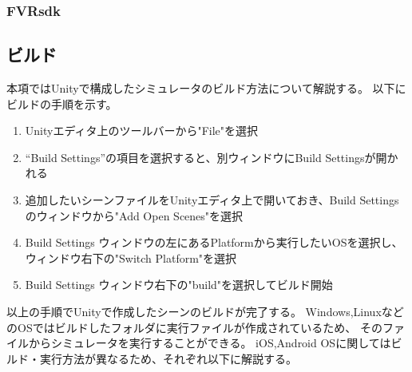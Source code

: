 \documentclass{ltjsreport}
\begin{document}
			\subsubsection{FVRsdk}
		\subsection{ビルド}
			本項ではUnityで構成したシミュレータのビルド方法について解説する。
			以下にビルドの手順を示す。
			\begin{enumerate}
				\item Unityエディタ上のツールバーから"File"を選択
				\item ``Build Settings''の項目を選択すると、別ウィンドウにBuild Settingsが開かれる
				\item 追加したいシーンファイルをUnityエディタ上で開いておき、Build Settingsのウィンドウから"Add Open Scenes"を選択
				\item Build Settings ウィンドウの左にあるPlatformから実行したいOSを選択し、ウィンドウ右下の"Switch Platform"を選択
				\item Build Settings ウィンドウ右下の"build"を選択してビルド開始
			\end{enumerate}
			以上の手順でUnityで作成したシーンのビルドが完了する。
			Windows,LinuxなどのOSではビルドしたフォルダに実行ファイルが作成されているため、
			そのファイルからシミュレータを実行することができる。
			iOS,Android OSに関してはビルド・実行方法が異なるため、それぞれ以下に解説する。
\end{document}
